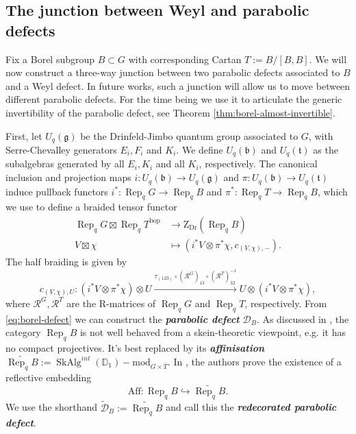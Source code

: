 \documentclass[a4paper]{article}
\numberwithin{equation}{section}
\newcommand{\1}{{\mathrm{1}\mkern-4mu{\mathchoice{}{}{\mskip-0.5mu}{\mskip-1mu}}\mathrm{l}}}
\newcommand{\DD}{\mathbb{D}}
\DeclareMathOperator{\Rep}{Rep}
\newcommand{\D}{\mathcal{D}}
\newcommand{\bop}{\text{bop}}
\newcommand{\Zdr}{\mathrm{Z}_{\text{Dr}}}
\renewcommand{\mod}{\mathrm{mod}}
\DeclareMathOperator{\SkAlg}{SkAlg}
\begin{document}
\subsection{The junction between Weyl and parabolic defects}\label{sec:weyl-parabolic-junction}

 Fix a Borel subgroup $B\subset G$ with corresponding Cartan $T:= B/[B,B]$.
 We will now construct a three-way junction between two parabolic defects associated to $B$ and a Weyl defect. 
 In future works, such a junction will allow us to move between different parabolic defects. For the time being we use it to articulate the generic invertibility of the parabolic defect, see Theorem \ref{thm:borel-almost-invertible}.
 
 First, let $U_q(\mathfrak{g})$ be the Drinfeld-Jimbo quantum group associated to $G$, with Serre-Chevalley generators $E_i,F_i$ and $K_i$. We define $U_q(\mathfrak{b})$ and $U_q(\mathfrak{t})$ as the subalgebras generated by all $E_i, K_i$ and all $K_i$, respectively.
 The canonical inclusion and projection maps $i: U_q(\mathfrak{b}) \to U_q(\mathfrak{g})$  and $\pi: U_q(\mathfrak{b}) \to U_q(\mathfrak{t})$ induce pullback functors $i^* \colon \Rep_q{G} \to \Rep_q{B}$ and $\pi^* \colon \Rep_q{T} \to \Rep_q{B}$, which we use to define a braided tensor functor
 \begin{equation}\label{eq:borel-defect}
    \begin{aligned} 
       \Rep_q{G} \boxtimes \Rep_q{T}^{\bop} & \rightarrow \Zdr(\Rep_q{B}) \\
       V \boxtimes \chi & \mapsto (i^\ast V \otimes \pi^\ast \chi , c_{(V , \chi) , -}).
    \end{aligned}
 \end{equation}
The half braiding is given by
    \begin{equation}\label{eq:half_braiding}
      c_{(V , \chi) , U}  \colon (i^\ast V \otimes \pi^\ast \chi) \otimes U \xrightarrow{\tau_{(1 2 3)} \circ (\mathcal{R}^G)_{1 3} \circ (\mathcal{R}^T)^{-1}_{3 2}} U \otimes (i^\ast V \otimes \pi^\ast \chi),
    \end{equation}
    where $\mathcal{R}^G, \mathcal{R}^T$ are the R-matrices of $\Rep_qG$ and $\Rep_qT$, respectively.
    From \eqref{eq:borel-defect} we can construct the \emph{\bf parabolic defect} $\D_B$.
    As discussed in \cite{Brown_Jordan_2025}, the category $\Rep_qB$ is not well behaved from a skein-theoretic viewpoint, e.g. it has no compact projectives.
    It's best replaced by its \emph{\bf affinisation} $\widetilde{\Rep_qB} := \SkAlg^{int}(\DD_1)-\mod_{G\times \overline{T}}$.
    In \cite{JLSS2021}, the authors prove the existence of a reflective embedding
    \begin{equation}\label{eq:B-affinisation}
        \textrm{Aff}: \Rep_qB \hookrightarrow\widetilde{\Rep_qB}.
    \end{equation}
    We use the shorthand $\widetilde{\D}_B := \widetilde{\Rep_qB}$ and call this the \emph{\bf redecorated parabolic defect}.
\end{document}
